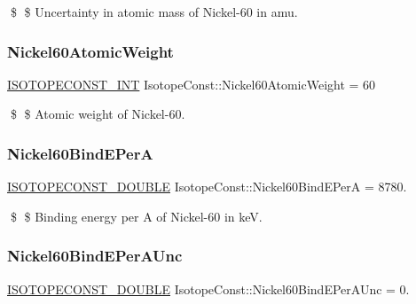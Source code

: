 \$ \$ Uncertainty in atomic mass of Nickel-\/60 in amu. \mbox{\label{group___isotope_const-_nickel-_ni60_ga3ae47d82e75d1a19fbb2cb160740c4f8}} 
\subsubsection{\texorpdfstring{Nickel60\+Atomic\+Weight}{Nickel60AtomicWeight}}
{\footnotesize\ttfamily \mbox{\hyperlink{group___isotope_const-_macros_ga5f18360b3e99483a35c32d789e62621c}{I\+S\+O\+T\+O\+P\+E\+C\+O\+N\+S\+T\+\_\+\+I\+NT}} Isotope\+Const\+::\+Nickel60\+Atomic\+Weight = 60}

\$ \$ Atomic weight of Nickel-\/60. \mbox{\label{group___isotope_const-_nickel-_ni60_gab8c26c28ff3767afa6efea4aec0b3af6}} 
\subsubsection{\texorpdfstring{Nickel60\+Bind\+E\+PerA}{Nickel60BindEPerA}}
{\footnotesize\ttfamily \mbox{\hyperlink{group___isotope_const-_macros_ga8f45a7272ce02c0b4c65c44636ed719a}{I\+S\+O\+T\+O\+P\+E\+C\+O\+N\+S\+T\+\_\+\+D\+O\+U\+B\+LE}} Isotope\+Const\+::\+Nickel60\+Bind\+E\+PerA = 8780.}

\$ \$ Binding energy per A of Nickel-\/60 in keV. \mbox{\label{group___isotope_const-_nickel-_ni60_ga941260ac1079e35add5e83908ed8c1d8}} 
\subsubsection{\texorpdfstring{Nickel60\+Bind\+E\+Per\+A\+Unc}{Nickel60BindEPerAUnc}}
{\footnotesize\ttfamily \mbox{\hyperlink{group___isotope_const-_macros_ga8f45a7272ce02c0b4c65c44636ed719a}{I\+S\+O\+T\+O\+P\+E\+C\+O\+N\+S\+T\+\_\+\+D\+O\+U\+B\+LE}} Isotope\+Const\+::\+Nickel60\+Bind\+E\+Per\+A\+Unc = 0.}

